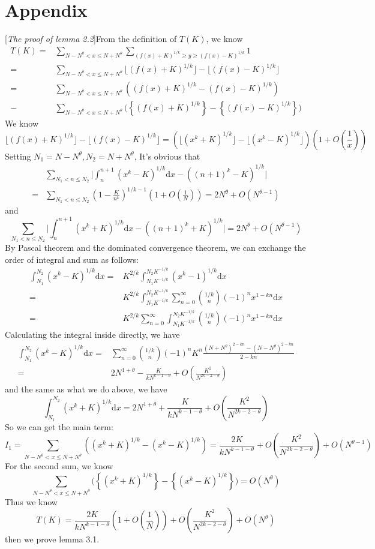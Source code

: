 \documentclass[10pt]{article}
\begin{document}
\section{Appendix}
[\emph{The proof of lemma 2.2}]From the definition of $T(K)$, we know
\begin{align*}
T(K)=&\sum\limits_{N-N^{\theta}<x\leq N+N^{\theta}}\sum\limits_{(f(x)+K)^{1/k}\geq y\geq(f(x)-K)^{1/k}}1\\
=&\sum\limits_{N-N^{\theta}<x\leq N+N^{\theta}}\lfloor(f(x)+K)^{1/k}\rfloor-\lfloor(f(x)-K)^{1/k}\rfloor\\
=&\sum\limits_{N-N^{\theta}<x\leq N+N^{\theta}}((f(x)+K)^{1/k}-(f(x)-K)^{1/k})\\
-&\sum\limits_{N-N^{\theta}<x\leq N+N^{\theta}}\big(\left\{(f(x)+K)^{1/k}\right\}-\left\{(f(x)-K)^{1/k}\right\}\big)
\end{align*}
We know
\[
\lfloor(f(x)+K)^{1/k}\rfloor-\lfloor(f(x)-K)^{1/k}\rfloor=(\lfloor(x^k+K)^{1/k}\rfloor-\lfloor(x^k-K)^{1/k}\rfloor)(1+O(\frac{1}{x}))
\]
Setting $N_1=N-N^\theta,N_2=N+N^\theta$, It's obvious that
\begin{align*}
&\sum\limits_{N_1<n\leq N_2}\bigg|\int_n^{n+1}(x^k-K)^{1/k}\mathrm{d}x-((n+1)^k-K)^{1/k}\bigg|\\
=&\sum\limits_{N_1<n\leq N_2}(1-\frac{K}{n^k})^{1/k-1}(1+O(\frac{1}{N}))=2N^{\theta}+O(N^{\theta-1})
\end{align*}
and
\[
\sum\limits_{N_1<n\leq N_2}\bigg|\int_n^{n+1}(x^k+K)^{1/k}\mathrm{d}x-((n+1)^k+K)^{1/k}\bigg|=2N^{\theta}+O(N^{\theta-1})
\]
By Pascal theorem and the dominated convergence theorem, we can exchange the order of integral and sum as follows:
\begin{align*}
\int_{N_1}^{N_2}(x^k-K)^{1/k}\mathrm{d}x=&K^{2/k}\int_{N_1K^{-1/k}}^{N_2K^{-1/k}}(x^k-1)^{1/k}\mathrm{d}x\\
=&K^{2/k}\int_{N_1K^{-1/k}}^{N_2K^{-1/k}}\sum\limits_{n=0}^\infty\binom{1/k}{n}(-1)^nx^{1-kn}\mathrm{d}x\\
=&K^{2/k}\sum\limits_{n=0}^\infty\int_{N_1K^{-1/k}}^{N_2K^{-1/k}}\binom{1/k}{n}(-1)^nx^{1-kn}\mathrm{d}x
\end{align*}
Calculating the integral inside directly, we have
\begin{align*}
\int_{N_1}^{N_2}(x^k-K)^{1/k}\mathrm{d}x=&\sum\limits_{n=0}^\infty\binom{1/k}{n}(-1)^n K^n\frac{(N+N^{\theta})^{2-kn}-(N-N^{\theta})^{2-kn}}{2-kn}\\
=&2N^{1+\theta}-\frac{K}{kN^{k-1-\theta}}+O(\frac{K^{2}}{N^{2k-2-\theta}})
\end{align*}
and the same as what we do above, we have
\[
\int_{N_1}^{N_2}(x^k+K)^{1/k}\mathrm{d}x=2N^{1+\theta}+\frac{K}{kN^{k-1-\theta}}+O(\frac{K^{2}}{N^{2k-2-\theta}})
\]
So we can get the main term:
\[
I_1=\sum\limits_{N-N^{\theta}<x\leq N+N^{\theta}}((x^k+K)^{1/k}-(x^k-K)^{1/k})=\frac{2K}{kN^{k-1-\theta}}+O(\frac{K^{2}}{N^{2k-2-\theta}})+O(N^{\theta-1})
\]
For the second sum, we know
\[
\sum\limits_{N-N^{\theta}<x\leq N+N^{\theta}}\big(\left\{(x^k+K)^{1/k}\right\}-\left\{(x^k-K)^{1/k}\right\}\big)=O(N^\theta)
\]
Thus we know
\[
T(K)=\frac{2K}{kN^{k-1-\theta}}(1+O(\frac{1}{N}))+O(\frac{K^{2}}{N^{2k-2-\theta}})+O(N^\theta)
\]
then we prove lemma 3.1.

\nocite{*}

\end{document}
